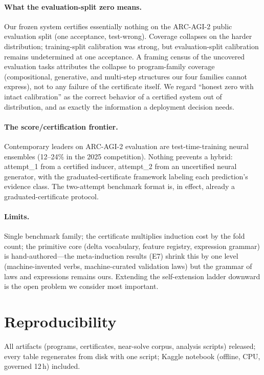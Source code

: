 \documentclass[11pt]{article}
\begin{document}
\paragraph{What the evaluation-split zero means.}
Our frozen system certifies essentially nothing on the ARC-AGI-2 public
evaluation split (one acceptance, test-wrong).  Coverage collapses on the
harder distribution; training-split calibration was strong, but
evaluation-split calibration remains undetermined at one acceptance.  A
framing census of the uncovered evaluation tasks attributes the collapse to
program-family coverage (compositional, generative, and multi-step
structures our four families cannot express), not to any failure of the
certificate itself.  We regard ``honest zero with intact calibration'' as
the correct behavior of a certified system out of distribution, and as
exactly the information a deployment decision needs.

\paragraph{The score/certification frontier.}
Contemporary leaders on ARC-AGI-2 evaluation are test-time-training neural
ensembles (12--24\% in the 2025 competition).  Nothing prevents a hybrid:
attempt\_1 from a certified inducer, attempt\_2 from an uncertified neural
generator, with the graduated-certificate framework labeling each
prediction's evidence class.  The two-attempt benchmark format is, in
effect, already a graduated-certificate protocol.

\paragraph{Limits.}
Single benchmark family; the certificate multiplies induction cost by the
fold count; the primitive core (delta vocabulary, feature registry,
expression grammar) is hand-authored---the meta-induction results (E7)
shrink this by one level (machine-invented verbs, machine-curated
validation laws) but the grammar of laws and expressions remains ours.
Extending the self-extension ladder downward is the open problem we
consider most important.

\section*{Reproducibility}

All artifacts (programs, certificates, near-solve corpus, analysis scripts)
released; every table regenerates from disk with one script; Kaggle
notebook (offline, CPU, governed 12\,h) included.
\end{document}
